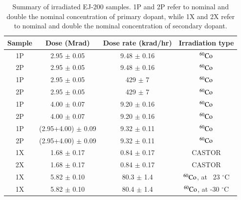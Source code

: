 \documentclass[preprint]{elsarticle}
\begin{document}
\begin{table}[!ht]
\centering
  \caption{Summary of irradiated EJ-200 samples. 
1P and 2P refer to nominal and double the nominal concentration of primary dopant, 
while 1X and 2X refer to nominal and double the nominal concentration of secondary dopant.}
  \begin{tabular}{c|c|c|c}
    \hline
    Sample          & Dose (Mrad)  		& Dose rate (krad/hr)    & Irradiation type  \\ \hline 
    1P 		    & 2.95 $\pm$ 0.05 		& 9.48 $\pm$ 0.16   	 & $\rm {^{60}Co}$  \\ 
    2P 		    & 2.95 $\pm$ 0.05		& 9.48 $\pm$ 0.16  	 & $\rm {^{60}Co}$	\\ \hline
    1P		    & 2.95 $\pm$ 0.05 		& 429 $\pm$ 7		 & $\rm {^{60}Co}$	\\ 
    2P		    & 2.95 $\pm$ 0.05 		& 429 $\pm$ 7		 & $\rm {^{60}Co}$	\\ \hline
    1P 		    & 4.00 $\pm$ 0.07		& 9.20 $\pm$ 0.16   	 & $\rm {^{60}Co}$	\\ 
    2P 		    & 4.00 $\pm$ 0.07		& 9.20 $\pm$ 0.16  	 & $\rm {^{60}Co}$	\\ \hline
    1P		    & (2.95+4.00) $\pm$ 0.09	& 9.32 $\pm$ 0.11	 & $\rm {^{60}Co}$	\\ 
    2P		    & (2.95+4.00) $\pm$ 0.09	& 9.32 $\pm$ 0.11	 & $\rm {^{60}Co}$	\\ \hline
    1X 		    & 1.68 $\pm$ 0.17		& 0.84 $\pm$ 0.17   	 & CASTOR	\\ 
    2X 		    & 1.68 $\pm$ 0.17		& 0.84 $\pm$ 0.17  	 & CASTOR 	\\ \hline
    1X		    & 5.82 $\pm$ 0.10		& 80.3 $\pm$ 1.4	 & $\rm {^{60}Co}$, at ~23 $^\circ$C\\ 
    1X		    & 5.82 $\pm$ 0.10		& 80.4 $\pm$ 1.4	 & $\rm {^{60}Co}$, at -30 $^\circ$C\\
    \hline
  \end{tabular}
  \label{table:samples}
\end{table}
\end{document}
